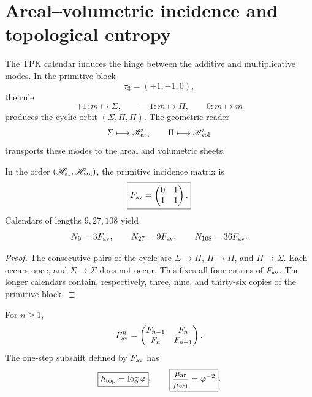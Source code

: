\section{Areal--volumetric incidence and topological entropy}

The TPK calendar induces the hinge between the additive and
multiplicative modes. In the primitive block
\[
 \tau_3=(+1,-1,0),
\]
the rule
\[
 +1:m\mapsto\Sigma,
 \qquad
 -1:m\mapsto\Pi,
 \qquad
 0:m\mapsto m
\]
produces the cyclic orbit \((\Sigma,\Pi,\Pi)\). The geometric reader
\[
 \Sigma\longmapsto\mathscr H_{\rm ar},
 \qquad
 \Pi\longmapsto\mathscr H_{\rm vol}
\]
transports these modes to the areal and volumetric sheets.

\begin{theorem}
\label{v:thm:incidencia-hojas-anexo}
In the order \((\mathscr H_{\rm ar},\mathscr H_{\rm vol})\), the
primitive incidence matrix is
\begin{equation}
 \boxed{
 F_{\rm av}=
 \begin{pmatrix}0&1\\1&1\end{pmatrix}.}
 \label{v:eq:fav-anexo-informacion}
\end{equation}
Calendars of lengths \(9,27,108\) yield
\[
 N_9=3F_{\rm av},
 \qquad N_{27}=9F_{\rm av},
 \qquad N_{108}=36F_{\rm av}.
\]
\end{theorem}

\begin{proof}
The consecutive pairs of the cycle are
\(\Sigma\to\Pi\), \(\Pi\to\Pi\), and \(\Pi\to\Sigma\). Each occurs
once, and \(\Sigma\to\Sigma\) does not occur. This fixes all four entries of
\(F_{\rm av}\). The longer calendars contain, respectively, three,
nine, and thirty-six copies of the primitive block.
\end{proof}

\begin{theorem}
\label{v:thm:fibonacci-parry-anexo}
For \(n\geq1\),
\begin{equation}
 F_{\rm av}^{n}
 =\begin{pmatrix}F_{n-1}&F_n\\F_n&F_{n+1}\end{pmatrix}.
 \label{v:eq:potencias-fav-anexo}
\end{equation}
The one-step subshift defined by \(F_{\rm av}\) has
\begin{equation}
 \boxed{h_{\rm top}=\log\varphi},
 \qquad
 \boxed{\frac{\mu_{\rm ar}}{\mu_{\rm vol}}=\varphi^{-2}}.
 \label{v:eq:entropia-parry-hojas-anexo}
\end{equation}
\end{theorem}

